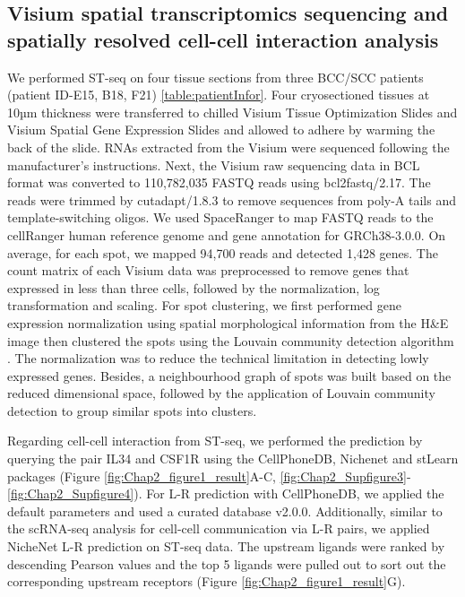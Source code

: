 \subsection{Visium spatial transcriptomics sequencing and spatially resolved cell-cell interaction analysis}
We performed ST-seq on four tissue sections from three BCC/SCC patients (patient ID-E15, B18, F21) \ref{table:patientInfor}. Four cryosectioned tissues at 10µm thickness were transferred to chilled Visium Tissue Optimization Slides and Visium Spatial Gene Expression Slides and allowed to adhere by warming the back of the slide. RNAs extracted from the Visium were sequenced following the manufacturer’s instructions. Next, the Visium raw sequencing data in BCL format was converted to 110,782,035 FASTQ reads using bcl2fastq/2.17. The reads were trimmed by cutadapt/1.8.3 to remove sequences from poly-A tails and template-switching oligos. We used SpaceRanger to map FASTQ reads to the cellRanger human reference genome and gene annotation for GRCh38-3.0.0. On average, for each spot, we mapped 94,700 reads and detected 1,428 genes. The count matrix of each Visium data was preprocessed to remove genes that expressed in less than three cells, followed by the normalization, log transformation and scaling. For spot clustering, we first performed gene expression normalization using spatial morphological information from the H\&E image then clustered the spots using the Louvain community detection algorithm \cite{pham2020stlearn}. The normalization was to reduce the technical limitation in detecting lowly expressed genes. Besides, a neighbourhood graph of spots was built based on the reduced dimensional space, followed by the application of Louvain community detection to group similar spots into clusters. 

Regarding cell-cell interaction from ST-seq, we performed the prediction by querying the pair IL34 and CSF1R using the CellPhoneDB, Nichenet and stLearn packages \cite{pham2020stlearn, efremova2020cellphonedb, browaeys2020nichenet} (Figure \ref{fig:Chap2_figure1_result}A-C, \ref{fig:Chap2_Supfigure3}-\ref{fig:Chap2_Supfigure4}). For L-R prediction with CellPhoneDB, we applied the default parameters \cite{browaeys2020nichenet, efremova2020cellphonedb} and used a curated database v2.0.0. Additionally, similar to the scRNA-seq analysis for cell-cell communication via L-R pairs, we applied NicheNet L-R prediction on ST-seq data. The upstream ligands were ranked by descending Pearson values and the top 5 ligands were pulled out to sort out the corresponding upstream receptors (Figure \ref{fig:Chap2_figure1_result}G).  


